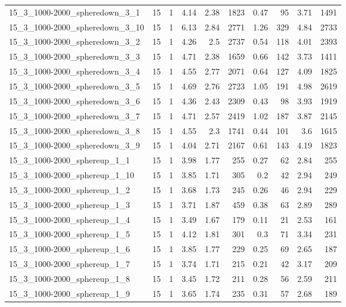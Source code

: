 \begin{center}
\begin{scriptsize}
\begin{longtable}{lrrrrrrrrr}
15\_3\_1000-2000\_spheredown\_3\_1 & 15 & 1 & 4.14 & 2.38 & 1823 & 0.47 & 95 & 3.71 & 1491\\
15\_3\_1000-2000\_spheredown\_3\_10 & 15 & 1 & 6.13 & 2.84 & 2771 & 1.26 & 329 & 4.84 & 2733\\
15\_3\_1000-2000\_spheredown\_3\_2 & 15 & 1 & 4.26 & 2.5 & 2737 & 0.54 & 118 & 4.01 & 2393\\
15\_3\_1000-2000\_spheredown\_3\_3 & 15 & 1 & 4.71 & 2.38 & 1659 & 0.66 & 142 & 3.73 & 1411\\
15\_3\_1000-2000\_spheredown\_3\_4 & 15 & 1 & 4.55 & 2.77 & 2071 & 0.64 & 127 & 4.09 & 1825\\
15\_3\_1000-2000\_spheredown\_3\_5 & 15 & 1 & 4.69 & 2.76 & 2723 & 1.05 & 191 & 4.98 & 2619\\
15\_3\_1000-2000\_spheredown\_3\_6 & 15 & 1 & 4.36 & 2.43 & 2309 & 0.43 & 98 & 3.93 & 1919\\
15\_3\_1000-2000\_spheredown\_3\_7 & 15 & 1 & 4.71 & 2.57 & 2419 & 1.02 & 187 & 3.87 & 2145\\
15\_3\_1000-2000\_spheredown\_3\_8 & 15 & 1 & 4.55 & 2.3 & 1741 & 0.44 & 101 & 3.6 & 1615\\
15\_3\_1000-2000\_spheredown\_3\_9 & 15 & 1 & 4.04 & 2.71 & 2167 & 0.61 & 143 & 4.19 & 1823\\
15\_3\_1000-2000\_sphereup\_1\_1 & 15 & 1 & 3.98 & 1.77 & 255 & 0.27 & 62 & 2.84 & 255\\
15\_3\_1000-2000\_sphereup\_1\_10 & 15 & 1 & 3.85 & 1.71 & 305 & 0.2 & 42 & 2.94 & 249\\
15\_3\_1000-2000\_sphereup\_1\_2 & 15 & 1 & 3.68 & 1.73 & 245 & 0.26 & 46 & 2.94 & 229\\
15\_3\_1000-2000\_sphereup\_1\_3 & 15 & 1 & 3.71 & 1.87 & 459 & 0.38 & 63 & 2.89 & 289\\
15\_3\_1000-2000\_sphereup\_1\_4 & 15 & 1 & 3.49 & 1.67 & 179 & 0.11 & 21 & 2.53 & 161\\
15\_3\_1000-2000\_sphereup\_1\_5 & 15 & 1 & 4.12 & 1.81 & 301 & 0.3 & 71 & 3.34 & 231\\
15\_3\_1000-2000\_sphereup\_1\_6 & 15 & 1 & 3.85 & 1.77 & 229 & 0.25 & 69 & 2.65 & 187\\
15\_3\_1000-2000\_sphereup\_1\_7 & 15 & 1 & 3.74 & 1.71 & 215 & 0.21 & 42 & 3.17 & 209\\
15\_3\_1000-2000\_sphereup\_1\_8 & 15 & 1 & 3.45 & 1.72 & 211 & 0.28 & 56 & 2.59 & 211\\
15\_3\_1000-2000\_sphereup\_1\_9 & 15 & 1 & 3.65 & 1.74 & 235 & 0.31 & 57 & 2.68 & 189\\

\end{longtable}
\end{scriptsize}
\end{center}
